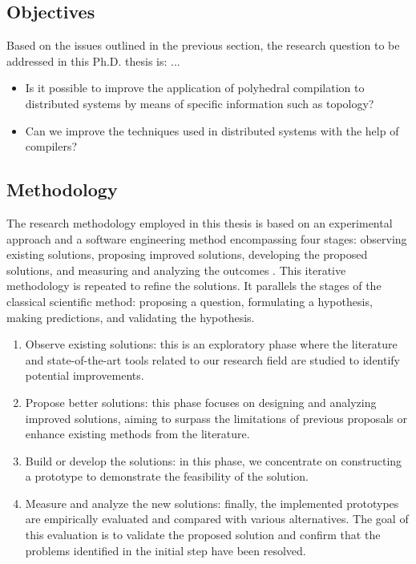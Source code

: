 \documentclass[a4paper, 11pt]{article}
\begin{document}

\subsection{Objectives}
Based on the issues outlined in the previous section, the research question to be addressed in this Ph.D. thesis is: ...
\begin{itemize}
    \item Is it possible to improve the application of polyhedral compilation to distributed systems by means of specific information such as topology?
    \item Can we improve the techniques used in distributed systems with the help of compilers?
\end{itemize}

\subsection{Methodology}
The research methodology employed in this thesis is based on an experimental approach and a software engineering method encompassing four stages: observing existing solutions, proposing improved solutions, developing the proposed solutions, and measuring and analyzing the outcomes \cite{adrion1993research}. This iterative methodology is repeated to refine the solutions. It parallels the stages of the classical scientific method: proposing a question, formulating a hypothesis, making predictions, and validating the hypothesis.

\begin{enumerate}
    \item Observe existing solutions: this is an exploratory phase where the literature and state-of-the-art tools related to our research field are studied to identify potential improvements.
    \item Propose better solutions: this phase focuses on designing and analyzing improved solutions, aiming to surpass the limitations of previous proposals or enhance existing methods from the literature.
    \item Build or develop the solutions: in this phase, we concentrate on constructing a prototype to demonstrate the feasibility of the solution.
    \item Measure and analyze the new solutions: finally, the implemented prototypes are empirically evaluated and compared with various alternatives. The goal of this evaluation is to validate the proposed solution and confirm that the problems identified in the initial step have been resolved.
\end{enumerate}
\end{document}

